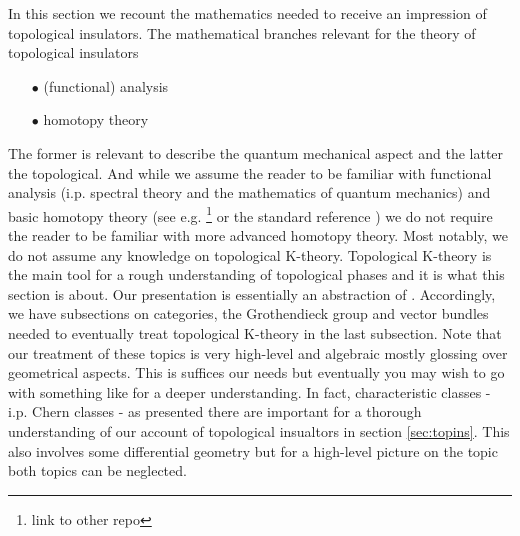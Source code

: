 \nocite{8b5861fc}
\nocite{c7f15065}
In this section we recount the mathematics needed to receive an impression of topological insulators. The mathematical branches relevant for the theory of topological insulators
\begin{enumerate}
\item[$\bullet$]
  (functional) analysis
\item[$\bullet$]
  homotopy theory
\end{enumerate}
The former is relevant to describe the quantum mechanical aspect and the latter the topological. And while we assume the reader to be familiar with functional analysis (i.p. spectral theory and the mathematics of quantum mechanics) and basic homotopy theory (see e.g. \footnote{link to other repo} or the standard reference \cite{8b5861fc}) we do not require the reader to be familiar with more advanced homotopy theory. Most notably, we do not assume any knowledge on topological K-theory. Topological K-theory is the main tool for a rough understanding of topological phases and it is what this section is about. Our presentation is essentially an abstraction of \cite{c7f15065}. Accordingly, we have subsections on categories, the Grothendieck group and vector bundles needed to eventually treat topological K-theory in the last subsection. Note that our treatment of these topics is very high-level and algebraic mostly glossing over geometrical aspects. This is suffices our needs but eventually you may wish to go with something like \cite{c7f15065} for a deeper understanding. In fact, characteristic classes - i.p. Chern classes - as presented there are important for a thorough understanding of our account of topological insualtors in section \ref{sec:topins}. This also involves some differential geometry but for a high-level picture on the topic both topics can be neglected.
\\
